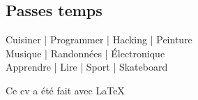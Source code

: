 \documentclass[a4paper,10pt]{article}
\begin{document}
\begin{adjustbox}{valign=t}
\begin{minipage}{0.6\textwidth}
\begin{multicols}{2}
\vfill\null \columnbreak  %

\section*{Passes temps}

\begin{spacing}{0.9}
Cuisiner | Programmer | Hacking | Peinture\\
Musique | Randonnées | Électronique\\
Apprendre | Lire | Sport | Skateboard
\end{spacing}

\vfill\null  %

\end{multicols}
\vspace{-1\baselineskip}

\LastUpdate

\vfill
\begin{flushright}
    Ce cv a été fait avec \LaTeX
\end{flushright}
\end{minipage}
\end{adjustbox}
\end{document}
